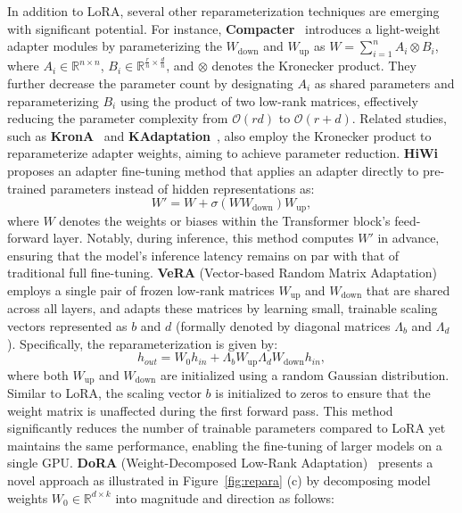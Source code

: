 In addition to LoRA, several other reparameterization techniques are emerging with significant potential. For instance, \textbf{Compacter}~\cite{2-Compacter} introduces a light-weight adapter modules by parameterizing the $W_{\text{down}}$ and $W_{\text{up}}$ as $W = \sum_{i=1}^{n} A_i \otimes B_i$, where $A_i \in \mathbb{R}^{n \times n}$, $B_i \in \mathbb{R}^{\frac{r}{n} \times \frac{d}{n}}$, and $\otimes$ denotes the Kronecker product. They further decrease the parameter count by designating $A_i$ as shared parameters and reparameterizing $B_i$ using the product of two low-rank matrices, effectively reducing the parameter complexity from $\mathcal{O}(rd)$ to $\mathcal{O}(r+d)$. 
Related studies, such as \textbf{KronA}~\cite{43-krona} and \textbf{KAdaptation}~\cite{44-he2023parameter}, also employ the Kronecker product to reparameterize adapter weights, aiming to achieve parameter reduction. 
\textbf{HiWi}~\cite{liao2023parameter} proposes an adapter fine-tuning method that applies an adapter directly to pre-trained parameters instead of hidden representations as:
\begin{equation}
W' = W + \sigma(WW_{\text{down}})W_{\text{up}},
\end{equation}
where $W$ denotes the weights or biases within the Transformer block's feed-forward layer. Notably, during inference, this method computes $W'$ in advance, ensuring that the model's inference latency remains on par with that of traditional full fine-tuning.
\textbf{VeRA} (Vector-based Random Matrix Adaptation)~\cite{kopiczko2023vera} employs a single pair of frozen low-rank matrices $W_{\text{up}}$ and $W_{\text{down}}$ that are shared across all layers, and adapts these matrices by learning small, trainable scaling vectors represented as $b$ and $d$ (formally denoted by diagonal matrices ${\Lambda}_b$ and ${\Lambda}_d$). Specifically, the reparameterization is given by:
\begin{equation}
    h_{out} = W_0h_{in} + {\Lambda}_b W_{\text{up}} {\Lambda}_d W_{\text{down}}h_{in},
\end{equation}
where both $W_{\text{up}}$ and $W_{\text{down}}$ are initialized using a random Gaussian distribution. Similar to LoRA, the scaling vector $b$ is initialized to zeros to ensure that the weight matrix is unaffected during the first forward pass.
This method significantly reduces the number of trainable parameters compared to LoRA yet maintains the same performance, enabling the fine-tuning of larger models on a single GPU.
\textbf{DoRA} (Weight-Decomposed Low-Rank Adaptation)~\cite{liu2024dora} presents a novel approach as illustrated in Figure~\ref{fig:repara} (c) by decomposing model weights $W_0 \in \mathbb{R}^{d \times k}$ into magnitude and direction as follows:
